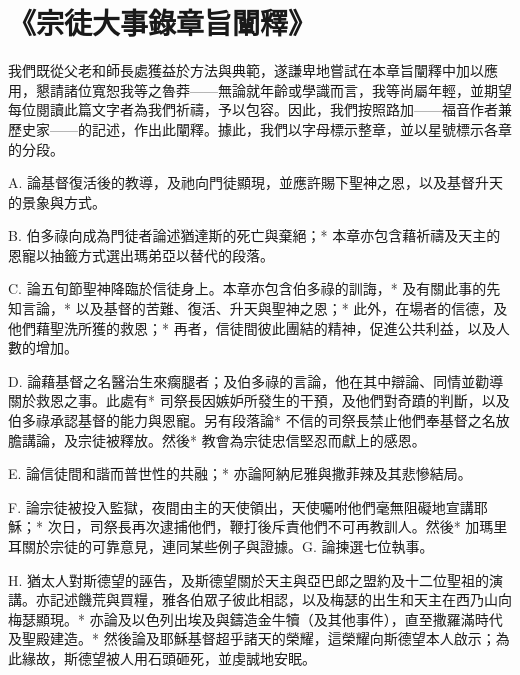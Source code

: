 
\chapter{《宗徒大事錄章旨闡釋》}


我們既從父老和師長處獲益於方法與典範，遂謙卑地嘗試在本章旨闡釋中加以應用，懇請諸位寬恕我等之魯莽——無論就年齡或學識而言，我等尚屬年輕，並期望每位閱讀此篇文字者為我們祈禱，予以包容。因此，我們按照路加——福音作者兼歷史家——的記述，作出此闡釋。據此，我們以字母標示整章，並以星號標示各章的分段。\par

A. 論基督復活後的教導，及祂向門徒顯現，並應許賜下聖神之恩，以及基督升天的景象與方式。\par

B. 伯多祿向成為門徒者論述猶達斯的死亡與棄絕；* 本章亦包含藉祈禱及天主的恩寵以抽籤方式選出瑪弟亞以替代的段落。\par

C. 論五旬節聖神降臨於信徒身上。本章亦包含伯多祿的訓誨，* 及有關此事的先知言論，* 以及基督的苦難、復活、升天與聖神之恩；* 此外，在場者的信德，及他們藉聖洗所獲的救恩；* 再者，信徒間彼此團結的精神，促進公共利益，以及人數的增加。\par

D. 論藉基督之名醫治生來瘸腿者；及伯多祿的言論，他在其中辯論、同情並勸導關於救恩之事。此處有* 司祭長因嫉妒所發生的干預，及他們對奇蹟的判斷，以及伯多祿承認基督的能力與恩寵。另有段落論* 不信的司祭長禁止他們奉基督之名放膽講論，及宗徒被釋放。然後* 教會為宗徒忠信堅忍而獻上的感恩。\par

E. 論信徒間和諧而普世性的共融；* 亦論阿納尼雅與撒菲辣及其悲慘結局。\par

F. 論宗徒被投入監獄，夜間由主的天使領出，天使囑咐他們毫無阻礙地宣講耶穌；* 次日，司祭長再次逮捕他們，鞭打後斥責他們不可再教訓人。然後* 加瑪里耳關於宗徒的可靠意見，連同某些例子與證據。G. 論揀選七位執事。\par

H. 猶太人對斯德望的誣告，及斯德望關於天主與亞巴郎之盟約及十二位聖祖的演講。亦記述饑荒與買糧，雅各伯眾子彼此相認，以及梅瑟的出生和天主在西乃山向梅瑟顯現。* 亦論及以色列出埃及與鑄造金牛犢（及其他事件），直至撒羅滿時代及聖殿建造。* 然後論及耶穌基督超乎諸天的榮耀，這榮耀向斯德望本人啟示；為此緣故，斯德望被人用石頭砸死，並虔誠地安眠。\par

